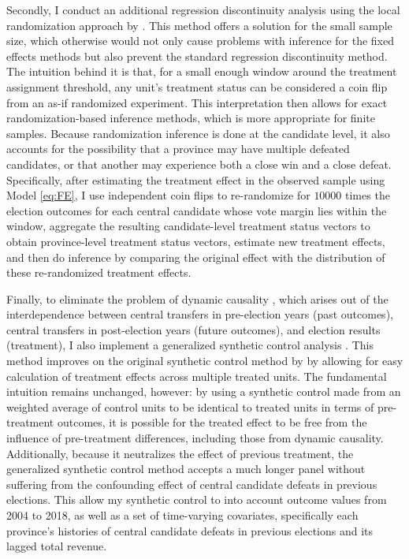 \documentclass[12pt]{article}
\newcommand{\1}{\mathbbm{1}}
\begin{document}
Secondly, I conduct an additional regression discontinuity analysis using the local randomization approach by \citet{CattaneoTitiunik2015}. This method offers a solution for the small sample size, which otherwise would not only cause problems with inference for the fixed effects methods but also prevent the standard regression discontinuity method. The intuition behind it is that, for a small enough window around the treatment assignment threshold, any unit's treatment status can be considered a coin flip from an as-if randomized experiment. This interpretation then allows for exact randomization-based inference methods, which is more appropriate for finite samples. Because randomization inference is done at the candidate level, it also accounts for the possibility that a province may have multiple defeated candidates, or that another may experience both a close win and a close defeat. Specifically, after estimating the treatment effect in the observed sample using Model \ref{eq:FE}, I use independent coin flips to re-randomize for $10000$ times the election outcomes for each central candidate whose vote margin lies within the window, aggregate the resulting candidate-level treatment status vectors to obtain province-level treatment status vectors, estimate new treatment effects, and then do inference by comparing the original effect with the distribution of these re-randomized treatment effects.

Finally, to eliminate the problem of dynamic causality \citep{ImaiKim2012}, which arises out of the interdependence between central transfers in pre-election years (past outcomes), central transfers in post-election years (future outcomes), and election results (treatment), I also implement a generalized synthetic control analysis \citep{Xu2017gsynth}. This method improves on the original synthetic control method by \citet{Abadie2010} by allowing for easy calculation of treatment effects across multiple treated units. The fundamental intuition remains unchanged, however: by using a synthetic control made from an weighted average of control units to be identical to treated units in terms of pre-treatment outcomes, it is possible for the treated effect to be free from the influence of pre-treatment differences, including those from dynamic causality. Additionally, because it neutralizes the effect of previous treatment, the generalized synthetic control method accepts a much longer panel without suffering from the confounding effect of central candidate defeats in previous elections. This allow my synthetic control to into account outcome values from 2004 to 2018, as well as a set of time-varying covariates, specifically each province's histories of central candidate defeats in previous elections and its lagged total revenue.
\end{document}

